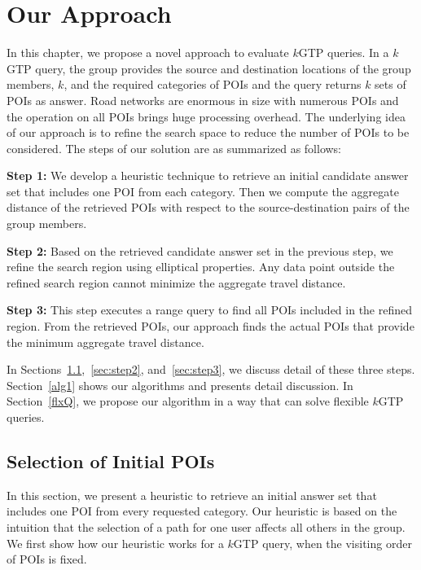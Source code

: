 \chapter{Our Approach}
\label{chap:ourapp}


In this chapter, we propose a novel approach to evaluate $k$GTP queries. In a $k$GTP query, the group provides the source and destination locations of the group members, $k$, and the required categories of POIs and the query returns $k$ sets of POIs as answer. Road networks are enormous in size with numerous POIs and the operation on all POIs brings huge processing overhead. The underlying idea of our approach is to refine the search space to reduce the number of POIs to be considered. The steps of our solution are as summarized as follows:


\vspace*{5pt}
\textbf{Step 1: } We develop a heuristic technique to retrieve an initial candidate answer set that includes one POI from each category. Then we compute the aggregate distance of the retrieved POIs with respect to the source-destination pairs of the group members.

\vspace*{5pt}
\textbf{Step 2: } Based on the retrieved candidate answer set in the previous step, we refine the search region using elliptical properties. Any data point outside the refined search region cannot minimize the aggregate travel distance.

\vspace*{5pt}
\textbf{Step 3: } This step executes a range query to find all POIs included in the refined region. From the retrieved POIs, our approach finds the actual POIs that provide the minimum aggregate travel distance.

\vspace*{8pt}
In Sections~\ref{sec:step1},~\ref{sec:step2}, and~\ref{sec:step3}, we discuss detail of these three steps. Section~\ref{alg1} shows our algorithms and presents detail discussion. In Section~\ref{flxQ}, we propose our algorithm in a way that can solve flexible $k$GTP queries. 




\section{Selection of Initial POIs}
\label{sec:step1}
In this section, we present a heuristic to retrieve an initial answer set that includes one POI from every requested category. Our heuristic is based on the intuition that the selection of a path for one user affects all others in the group. We first show how our heuristic works for a $k$GTP query, when the visiting order of POIs is fixed.

